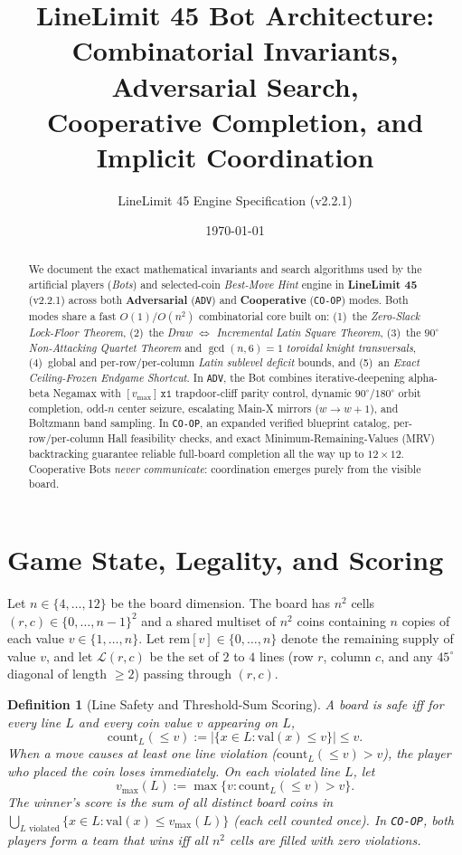 \documentclass[10pt,a4paper]{article}
\title{\textbf{LineLimit 45 Bot Architecture:\\Combinatorial Invariants, Adversarial Search,\\Cooperative Completion, and Implicit Coordination}}
\author{LineLimit 45 Engine Specification (v2.2.1)}
\date{\today}
\newtheorem{definition}[theorem]{Definition}
\theoremstyle{remark}
\begin{document}
\maketitle

\begin{abstract}
We document the exact mathematical invariants and search algorithms used by the artificial players (\emph{Bots}) and selected-coin \emph{Best-Move Hint} engine in \textbf{LineLimit 45} (v2.2.1) across both \textbf{Adversarial} (\texttt{ADV}) and \textbf{Cooperative} (\texttt{CO-OP}) modes. Both modes share a fast $O(1)/O(n^2)$ combinatorial core built on: (1)~the \emph{Zero-Slack Lock-Floor Theorem}, (2)~the \emph{Draw $\Longleftrightarrow$ Incremental Latin Square Theorem}, (3)~the \emph{$90^\circ$ Non-Attacking Quartet Theorem} and $\gcd(n,6)=1$ \emph{toroidal knight transversals}, (4)~global and per-row/per-column \emph{Latin sublevel deficit} bounds, and (5)~an \emph{Exact Ceiling-Frozen Endgame Shortcut}. In \texttt{ADV}, the Bot combines iterative-deepening alpha-beta Negamax with $[v_{\max}]\,\texttt{x1}$ trapdoor-cliff parity control, dynamic $90^\circ$/$180^\circ$ orbit completion, odd-$n$ center seizure, escalating Main-X mirrors ($w \to w+1$), and Boltzmann band sampling. In \texttt{CO-OP}, an expanded verified blueprint catalog, per-row/per-column Hall feasibility checks, and exact Minimum-Remaining-Values (MRV) backtracking guarantee reliable full-board completion all the way up to $12 \times 12$. Cooperative Bots \emph{never communicate}: coordination emerges purely from the visible board.
\end{abstract}

\section{Game State, Legality, and Scoring}

Let $n \in \{4, \dots, 12\}$ be the board dimension. The board has $n^2$ cells $(r,c) \in \{0,\dots,n-1\}^2$ and a shared multiset of $n^2$ coins containing $n$ copies of each value $v \in \{1,\dots,n\}$. Let $\mathrm{rem}[v] \in \{0,\dots,n\}$ denote the remaining supply of value $v$, and let $\mathcal{L}(r,c)$ be the set of $2$ to $4$ lines (row $r$, column $c$, and any $45^\circ$ diagonal of length $\ge 2$) passing through $(r,c)$.

\begin{definition}[Line Safety and Threshold-Sum Scoring]
A board is \emph{safe} iff for every line $L$ and every coin value $v$ appearing on $L$,
\[
  \mathrm{count}_L(\le v) := |\{x \in L : \mathrm{val}(x) \le v\}| \le v.
\]
When a move causes at least one line violation ($\mathrm{count}_L(\le v) > v$), the player who placed the coin loses immediately. On each violated line $L$, let
\[
  v_{\max}(L) := \max\{v : \mathrm{count}_L(\le v) > v\}.
\]
The winner's score is the sum of all distinct board coins in $\bigcup_{L \text{ violated}} \{x \in L : \mathrm{val}(x) \le v_{\max}(L)\}$ (each cell counted once). In \texttt{CO-OP}, both players form a team that wins iff all $n^2$ cells are filled with zero violations.
\end{definition}
\end{document}
